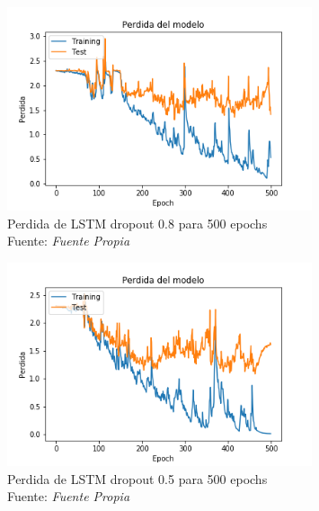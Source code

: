 \begin{figure}[H]
	\centering
	\includegraphics[width=0.8\textwidth]{Figures/lstm_drop08cost.png}
	\caption{Perdida de LSTM dropout 0.8 para 500 epochs\\ Fuente: {\textit{Fuente Propia}}}
	\label{LSTMdropout5cost}
\end{figure} 


\begin{figure}[H]
	\centering
	\includegraphics[width=0.8\textwidth]{Figures/LSTM_drocost05.png}
	\caption{Perdida de LSTM dropout 0.5 para 500 epochs\\ Fuente: {\textit{Fuente Propia}}}
	\label{LSTMdropout8cost}
\end{figure} 